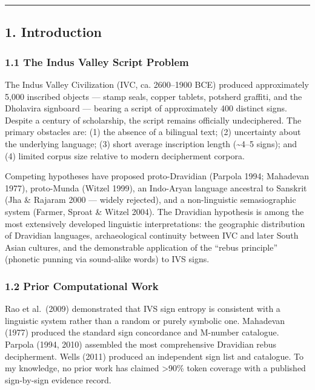 \documentclass[
]{article}
\begin{document}
\begin{center}\rule{0.5\linewidth}{0.5pt}\end{center}

\subsection{1. Introduction}\label{introduction}

\subsubsection{1.1 The Indus Valley Script
Problem}\label{the-indus-valley-script-problem}

The Indus Valley Civilization (IVC, ca. 2600--1900 BCE) produced
approximately 5,000 inscribed objects --- stamp seals, copper tablets,
potsherd graffiti, and the Dholavira signboard --- bearing a script of
approximately 400 distinct signs. Despite a century of scholarship, the
script remains officially undeciphered. The primary obstacles are: (1)
the absence of a bilingual text; (2) uncertainty about the underlying
language; (3) short average inscription length (\textasciitilde4--5
signs); and (4) limited corpus size relative to modern decipherment
corpora.

Competing hypotheses have proposed proto-Dravidian (Parpola 1994;
Mahadevan 1977), proto-Munda (Witzel 1999), an Indo-Aryan language
ancestral to Sanskrit (Jha \& Rajaram 2000 --- widely rejected), and a
non-linguistic semasiographic system (Farmer, Sproat \& Witzel 2004).
The Dravidian hypothesis is among the most extensively developed linguistic interpretations: the
geographic distribution of Dravidian languages, archaeological
continuity between IVC and later South Asian cultures, and the
demonstrable application of the ``rebus principle'' (phonetic punning
via sound-alike words) to IVS signs.

\subsubsection{1.2 Prior Computational
Work}\label{prior-computational-work}

Rao et al.~(2009) demonstrated that IVS sign entropy is consistent with
a linguistic system rather than a random or purely symbolic one.
Mahadevan (1977) produced the standard sign concordance and M-number
catalogue. Parpola (1994, 2010) assembled the most comprehensive
Dravidian rebus decipherment. Wells (2011) produced an independent sign
list and catalogue. To my knowledge, no prior work has claimed \textgreater90\% token
coverage with a published sign-by-sign evidence record.
\end{document}
